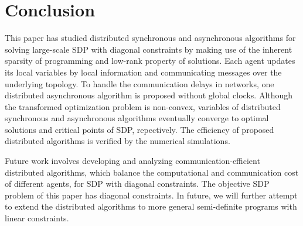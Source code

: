 \documentclass[journal]{IEEEtran}
\begin{document}
\section{Conclusion}\label{conclusion}
This paper has studied distributed synchronous and asynchronous algorithms for solving large-scale SDP with diagonal constraints by making use of the inherent sparsity of programming and low-rank property of solutions. Each agent updates its local variables by local information and communicating messages over the underlying topology. To handle the communication delays in networks, one distributed asynchronous algorithm is proposed without  global clocks. Although the transformed optimization problem is non-convex, variables of distributed synchronous and asynchronous algorithms eventually converge to optimal solutions and critical points of SDP, repectively.  The efficiency of proposed distributed algorithms is verified by the numerical simulations.
\par Future work involves developing and analyzing communication-efficient distributed algorithms, which balance the computational and communication cost of different agents, for SDP with diagonal constraints. The objective SDP problem of this paper has diagonal constraints. In future, we will further attempt to extend the distributed algorithms to more general semi-definite programs with linear constraints. 


\end{document}
